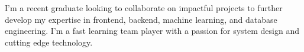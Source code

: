\documentclass[letter,10pt]{article}
\begin{document}
\def\introstatement{I'm a recent graduate looking to collaborate on impactful projects to further develop my expertise in frontend, backend, machine learning, and database engineering. I'm a fast learning team player with a passion for system design and cutting edge technology.}


\begin{flushleft}
    \introstatement{}
\end{flushleft}
\end{document}
